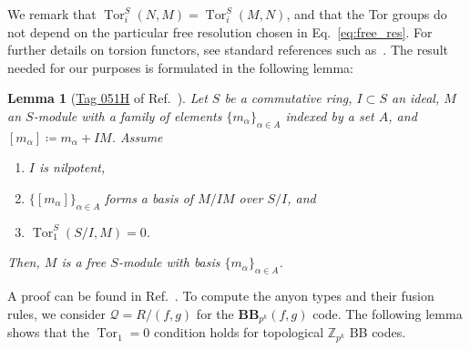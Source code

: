 \documentclass[aps,prb,english,superscriptaddress,twocolumn,tightenlines,showpacs,longbibliography,floatfix,amsfonts]{revtex4-2}
\newtheorem{lem}{Lemma}
\begin{document}
We remark that $\operatorname{Tor}_{i}^S(N,M)=\operatorname{Tor}_{i}^S(M,N)$, and that the Tor groups do not depend on the particular free resolution chosen in Eq.~\eqref{eq:free_res}. For further details on torsion functors, see standard references such as~\cite{Rotman2009, Eisenbud1995, StacksProject}. The result needed for our purposes is formulated in the following lemma:
\begin{lem}[\href{https://stacks.math.columbia.edu/tag/051H}{Tag 051H} of Ref.~\cite{StacksProject}]
    Let $S$ be a commutative ring, $I\subset S$ an ideal, $M$ an $S$-module with a family of elements $\{m_{\alpha}\}_{\alpha \in A}$ indexed by a set $A$, and $[m_{\alpha}] \coloneqq m_{\alpha}+IM$. Assume
    \begin{enumerate}
    \item[(i)] $I$ is nilpotent,
    \item[(ii)] $\{[m_{\alpha}]\}_{\alpha\in A}$  forms a basis of $M/IM$ over $S/I$, and
    \item[(iii)] $\operatorname{Tor}_1^S(S/I,M)=0$.
    \end{enumerate}
Then, $M$ is a free $S$-module with basis $\{m_{\alpha}\}_{\alpha\in A}$.\label{lem:tor1}
\end{lem}

A proof can be found in Ref.~\cite[\href{https://stacks.math.columbia.edu/tag/051H}{Tag 051H}]{StacksProject}. To compute the anyon types and their fusion rules, we consider $\mathcal{Q} = R/(f,g)$ for the $\mathbf{BB}_{p^k}(f,g)$ code.
The following lemma shows that the $\operatorname{Tor}_1=0$ condition holds for topological $\mathbb{Z}_{p^k}$ BB codes.
\end{document}
